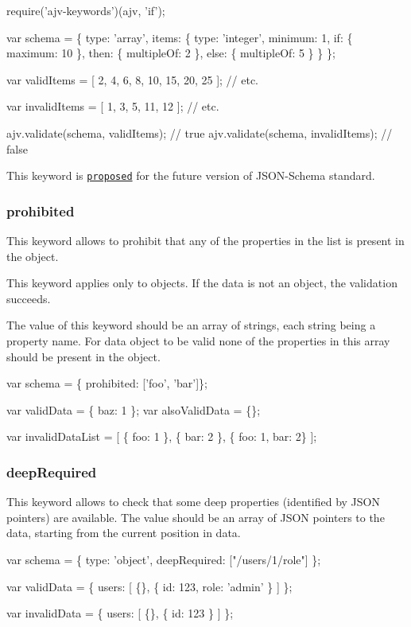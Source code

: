\begin{DoxyCode}
require('ajv-keywords')(ajv, 'if');

var schema = \{
  type: 'array',
  items: \{
    type: 'integer',
    minimum: 1,
    if: \{ maximum: 10 \},
    then: \{ multipleOf: 2 \},
    else: \{ multipleOf: 5 \}
  \}
\};

var validItems = [ 2, 4, 6, 8, 10, 15, 20, 25 ]; // etc.

var invalidItems = [ 1, 3, 5, 11, 12 ]; // etc.

ajv.validate(schema, validItems); // true
ajv.validate(schema, invalidItems); // false
\end{DoxyCode}


This keyword is \href{https://github.com/json-schema-org/json-schema-spec/issues/180}{\tt proposed} for the future version of J\+S\+O\+N-\/\+Schema standard.

\subsubsection*{{\ttfamily prohibited}}

This keyword allows to prohibit that any of the properties in the list is present in the object.

This keyword applies only to objects. If the data is not an object, the validation succeeds.

The value of this keyword should be an array of strings, each string being a property name. For data object to be valid none of the properties in this array should be present in the object.


\begin{DoxyCode}
var schema = \{ prohibited: ['foo', 'bar']\};

var validData = \{ baz: 1 \};
var alsoValidData = \{\};

var invalidDataList = [
  \{ foo: 1 \},
  \{ bar: 2 \},
  \{ foo: 1, bar: 2\}
];
\end{DoxyCode}


\subsubsection*{{\ttfamily deep\+Required}}

This keyword allows to check that some deep properties (identified by J\+S\+ON pointers) are available. The value should be an array of J\+S\+ON pointers to the data, starting from the current position in data.


\begin{DoxyCode}
var schema = \{
  type: 'object',
  deepRequired: ["/users/1/role"]
\};

var validData = \{
  users: [
    \{\},
    \{
      id: 123,
      role: 'admin'
    \}
  ]
\};

var invalidData = \{
  users: [
    \{\},
    \{
      id: 123
    \}
  ]
\};
\end{DoxyCode}


